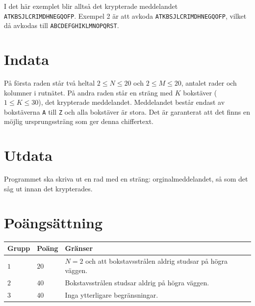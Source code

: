 I det här exemplet blir alltså det krypterade meddelandet \texttt{ATKBSJLCRIMDHNEGQOFP}. 
Exempel 2 är att avkoda \texttt{ATKBSJLCRIMDHNEGQOFP}, vilket då avkodas till \texttt{ABCDEFGHIKLMNOPQRST}.

\section*{Indata}
På första raden står två heltal $2 \leq N \leq 20$ och $2 \leq M \leq 20$, antalet rader och kolumner i rutnätet.  
På andra raden står en sträng med $K$ bokstäver ($1 \leq K \leq 30$), det krypterade meddelandet. Meddelandet består endast av bokstäverna \texttt{A} till \texttt{Z} och alla bokstäver är stora.
Det är garanterat att det finns en möjlig ursprungssträng som ger denna chiffertext.

\section*{Utdata}
Programmet ska skriva ut en rad med en sträng: orginalmeddelandet, så som det såg ut innan det krypterades.

\section*{Poängsättning}
\noindent
\begin{tabular}{| l | l | p{12cm} |}
  \hline
  \textbf{Grupp} & \textbf{Poäng} & \textbf{Gränser} \\ \hline
  $1$    & $20$       & $N=2$ och att bokstavsstrålen aldrig studsar på högra väggen. \\ \hline
  $2$    & $40$       & Bokstavsstrålen studsar aldrig på högra väggen. \\ \hline
  $3$    & $40$       & Inga ytterligare begränsningar. \\ \hline
\end{tabular}

